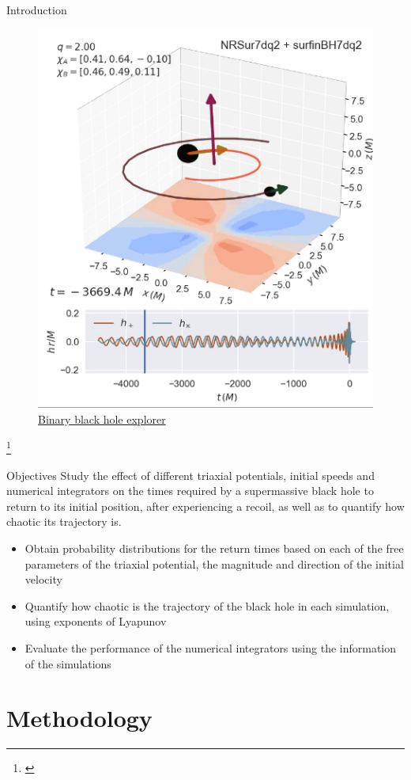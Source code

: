 \documentclass{beamer}
\newcommand\blfootnote[1]
{%
	\begingroup
	\renewcommand\thefootnote{}\footnote{#1}%
	\addtocounter{footnote}{-1}%
	\endgroup
}
\newcommand{\fcite}[1]{\blfootnote{\tiny\cite{#1}}}
\begin{document}
\begin{frame}{Introduction}
	\begin{figure}
		\centering
		\includegraphics[width=0.4\linewidth]{images/example}
		\caption{\href{run:/home/juan/Documents/TesisFisica/Slides/images/super_kick.mp4}{Binary black hole explorer}}
	\end{figure}
	
	\fcite{varma2018binary}
\end{frame}

\begin{frame}{Objectives}
	\small
	Study the effect of different triaxial potentials, initial speeds and numerical integrators on the times required by a supermassive black hole to return to its initial position, after experiencing a recoil, as well as to quantify how chaotic its trajectory is.
	
	\begin{itemize}
		\item Obtain probability distributions for the return times based on each of the free parameters of the triaxial potential, the magnitude and direction of the initial velocity
		\item Quantify how chaotic is the trajectory of the black hole in each simulation, using exponents of Lyapunov
		\item Evaluate the performance of the numerical integrators using the information of the simulations
	\end{itemize}
\end{frame}

\section{Methodology}
\end{document}
